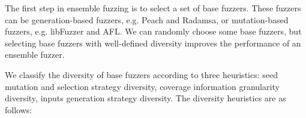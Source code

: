 
The first step in ensemble fuzzing is to select a set of base fuzzers. These fuzzers can be generation-based fuzzers, e.g. Peach and Radamsa, or mutation-based fuzzers, e.g. libFuzzer and AFL. We can randomly choose some base fuzzers, but selecting base fuzzers with well-defined diversity improves the performance of an ensemble fuzzer. 

\begin{comment}
Let us take the coverage information for example. Suppose that we have a set of base fuzzers \(F = \{ fuzzer_1, fuzzer_2, \ldots , fuzzer_k \} \). The code coverage of target program \(P\) by \(fuzzer_j \) is \(C_j\). If we use all these \(k\) base fuzzers together to fuzz the target program \(P\), the total code coverage of \(P\) will be their union, that is \( C = C_1 \cup C_2 \cup C_3 \ldots \cup C_k \). The following two points are critical: 
\vspace{0.03in}
\begin{itemize}

	 \item [1.] If \( C_1 \cap C_2 \cap C_3 \ldots \cap C_k  \neq \emptyset \), then \( |C| \>> |C_j|\) where \(j\in 1, \ldots , k\), it means that the ensemble fuzzer always performs better than that of any base fuzzer.  

	 \item [2.] The smaller \( |C_i \cap C_j| \) is, the bigger \( |C_i \cup C_j|\) is, and the bigger \(|C|\) is, where \(0 \leq i, j \leq k, i \neq j \). 
	 
\end{itemize}
\vspace{0.03in} 
Therefore, the diversity of base fuzzers is the difference between their fuzzing strategies. The greater the difference of these base fuzzers, the more diversity they have, the better coverage ensemble fuzzers perform. 
\end{comment}

We classify the diversity of base fuzzers according to three heuristics: seed mutation and selection strategy diversity, coverage information granularity diversity, inputs generation strategy diversity. The diversity heuristics are as follows: 

